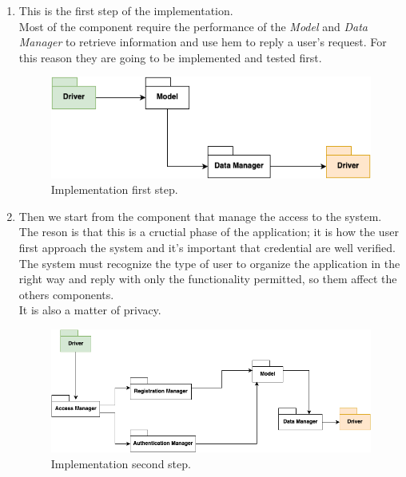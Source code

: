 \begin{enumerate}
    \item This is the first step of the implementation. \\Most of the component require the performance of the \textsl{Model} and \textsl{Data Manager} to retrieve information and use hem to reply a user’s request. For this reason they are going to be implemented and tested first. 
    \begin{figure}[H]
        \begin{center}
        \includegraphics[width=1\textwidth]{implementation/step1.png}
        \caption{Implementation first step.}
        \label{fig:first step}
        \end{center}
    \end{figure}
    \item Then we start from the component that manage the access to the system. The reson is that this is a cructial phase of the application; it is how the user first approach the system and it's important that credential are well verified. The system must recognize the type of user to organize the application in the right way and reply with only the functionality permitted, so them affect the others components.\\ It is also a matter of privacy. 
    \begin{figure}[H]
        \begin{center}
        \includegraphics[width=1\textwidth]{implementation/step2.png}
        \caption{Implementation second step.}
        \label{fig:second step}
        \end{center}

\end{figure}
\end{enumerate}
